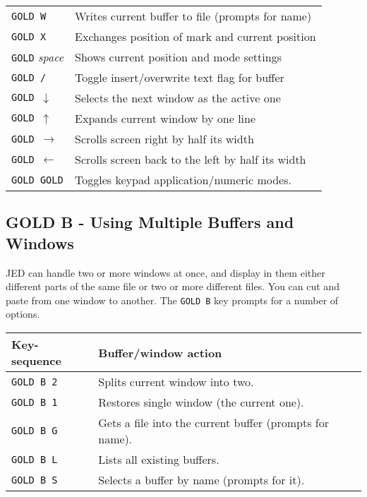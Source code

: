 \documentclass[twoside,11pt]{starlink}
\begin{document}
\begin{center}
\begin{tabular}{|ll|}
\texttt{GOLD W} & Writes current buffer to file (prompts for name) \\
\texttt{GOLD X} & Exchanges position of mark and current position \\
\texttt{GOLD} \textit{space}   & Shows current position and mode settings \\
\texttt{GOLD /} & Toggle insert/overwrite text flag for buffer \\
\texttt{GOLD $\downarrow$}  & Selects the next window as the active one\\
\texttt{GOLD $\uparrow$  }  & Expands current window by one line \\
\texttt{GOLD $\rightarrow$} & Scrolls screen right by half its width \\
\texttt{GOLD $\leftarrow$ } & Scrolls screen back to the left by half its width \\
\texttt{GOLD GOLD}          & Toggles keypad application/numeric modes.\\
\hline
\end{tabular}
\end{center}


\subsection{%
GOLD B - Using Multiple Buffers and Windows}
\label{gold_b_-_using_multiple_buffers_and_windows}
\label{buff-ops}

JED can handle two or more windows at once, and display in them either
different parts of the same file or two or more different files.  You
can cut and paste from one window to another. The \texttt{GOLD B} key prompts for a number of options.

\begin{center}
\begin{tabular}{|ll|}
\hline
Key-sequence & Buffer/window action \\
\hline
\texttt{GOLD B 2} & Splits current window into two.\\
\texttt{GOLD B 1} & Restores single window (the current one).\\
\texttt{GOLD B G} & Gets a file into the current buffer (prompts for name).\\
\texttt{GOLD B L} & Lists all existing buffers.\\
\texttt{GOLD B S} & Selects a buffer by name (prompts for it).\\
\hline
\end{tabular}
\end{center}
\end{document}
